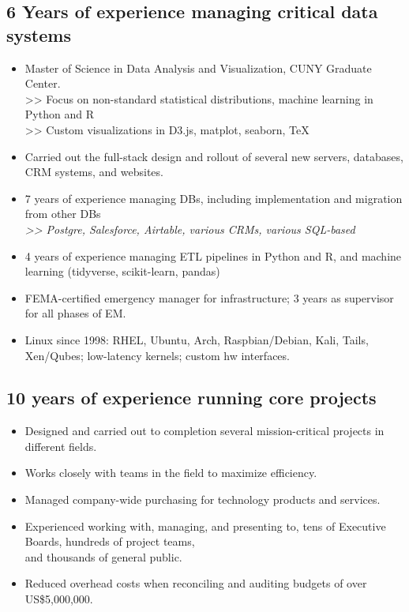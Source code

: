 \documentclass[]{deedy-resume-openfont}
\begin{document}
\subsection{6 Years of experience managing critical data systems}
\vspace{\topsep}
    \begin{itemize}
        \item Master of Science in Data Analysis and Visualization, CUNY Graduate Center. \\
        >> Focus on non-standard statistical distributions, machine learning in Python and R \\
        >> Custom visualizations in D3.js, matplot, seaborn, \TeX
        \item Carried out the full-stack design and rollout of several new servers, databases, CRM systems, and websites.
        \item 7 years of experience managing DBs, including implementation and migration from other DBs \\ \textit{>> Postgre, Salesforce, Airtable, various CRMs, various SQL-based}
        \item 4 years of experience managing ETL pipelines in Python and R, and machine learning (tidyverse, scikit-learn, pandas)
        \item FEMA-certified emergency manager for infrastructure; 3 years as supervisor for all phases of EM.
        \item Linux since 1998: RHEL, Ubuntu, Arch, Raspbian/Debian, Kali, Tails, Xen/Qubes; low-latency kernels; custom hw interfaces.
    \end{itemize}
\subsection{10 years of experience running core projects}
\vspace{\topsep}
    \begin{itemize} 
    	\item Designed and carried out to completion several mission-critical projects in different fields.
        \item Works closely with teams in the field to maximize efficiency.
        \item Managed company-wide purchasing for technology products and services.
        \item Experienced working with, managing, and presenting to, tens of Executive Boards, hundreds of project teams, \\ and thousands of general public.
		\item Reduced overhead costs when reconciling and auditing budgets of over US\$5,000,000.
	\end{itemize}
\end{document}
